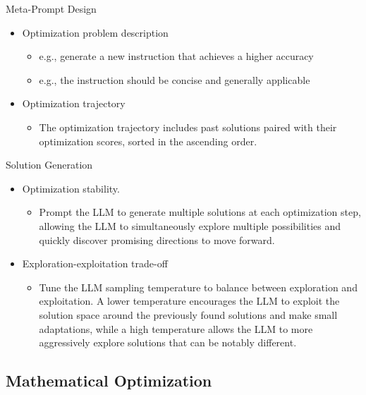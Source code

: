 \documentclass[aspectratio=1610,xcolor={dvipsnames},hyperref={colorlinks,unicode,linkcolor=violet,anchorcolor=BlueViolet,citecolor=YellowOrange,filecolor=black,urlcolor=Aquamarine}]{beamer}
\begin{document}
\begin{frame}[label={sec:orgcb6c590}]{Meta-Prompt Design}
\begin{itemize}
\item Optimization problem description
\begin{itemize}
\item e.g., generate a new instruction that achieves a higher accuracy
\item e.g., the instruction should be concise and generally applicable
\end{itemize}
\item Optimization trajectory
\begin{itemize}
\item The optimization trajectory includes past solutions paired with their optimization scores, sorted in the \alert{ascending} order.
\end{itemize}
\end{itemize}
\end{frame}
\begin{frame}[label={sec:org6482144}]{Solution Generation}
\begin{itemize}
\item Optimization stability.
\begin{itemize}
\item Prompt the LLM to generate multiple solutions at each optimization step, allowing the LLM to simultaneously explore multiple possibilities and quickly discover promising directions to move forward.
\end{itemize}
\item Exploration-exploitation trade-off
\begin{itemize}
\item Tune the LLM sampling temperature to balance between exploration and exploitation. A lower temperature encourages the LLM to exploit the solution space around the previously found solutions and make small adaptations, while a high temperature allows the LLM to more aggressively explore solutions that can be notably different.
\end{itemize}
\end{itemize}
\end{frame}
\subsection{Mathematical Optimization}
\label{sec:org4f7a964}
\end{document}
